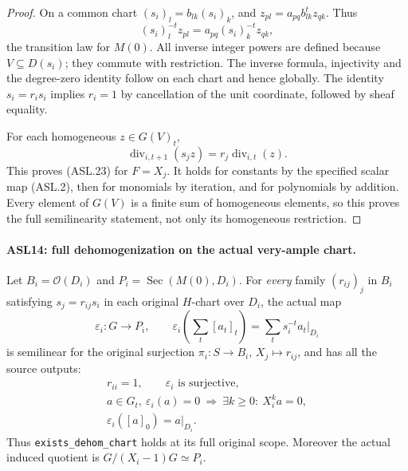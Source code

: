 \documentclass[11pt,a4paper]{article}
\numberwithin{equation}{section}
\theoremstyle{remark}\newtheorem{remark}[theorem]{Remark}
\begin{document}
\begin{proof}
On a common chart $(s_i)_l=b_{lk}(s_i)_k$, and
$z_{pl}=a_{pq}b_{lk}^{t}z_{qk}$.  Thus
\[
 (s_i)_l^{-t}z_{pl}
       =a_{pq}(s_i)_k^{-t}z_{qk},
\]
the transition law for $M(0)$.  All inverse integer powers
are defined because $V\subseteq D(s_i)$; they commute with
restriction.  The inverse formula, injectivity and the
degree-zero identity follow on each chart and hence globally.
The identity $s_i=r_is_i$ implies $r_i=1$ by cancellation
of the unit coordinate, followed by sheaf equality.

For each homogeneous $z\in G(V)_t$,
\[
 \operatorname{div}_{i,t+1}(s_jz)
               =r_j\operatorname{div}_{i,t}(z).
\]
This proves (ASL.23) for $F=X_j$.  It holds for constants by
the specified scalar map (ASL.2), then for monomials by iteration,
and for polynomials by addition.  Every element of $G(V)$ is a
finite sum of homogeneous elements, so this proves the full
semilinearity statement, not only its homogeneous restriction.
\end{proof}

\paragraph{ASL14: full dehomogenization on the actual very-ample chart.}
\label{claim:ASL14}
Let $B_i=\mathcal O(D_i)$ and
$P_i=\operatorname{Sec}(M(0),D_i)$.  For \emph{every} family
$(r_{ij})_j$ in $B_i$ satisfying $s_j=r_{ij}s_i$ in each original
$H$-chart over $D_i$, the actual map
\[
 \varepsilon_i:G\longrightarrow P_i,
 \qquad \varepsilon_i\left(\sum_t[a_t]_t\right)
                     =\sum_t s_i^{-t}a_t|_{D_i}
                                                        \tag{ASL.24}
\]
is semilinear for the original surjection
$\pi_i:S\to B_i$, $X_j\mapsto r_{ij}$, and has all the
source outputs:
\[
 \begin{gathered}
 r_{ii}=1,\qquad \varepsilon_i\text{ is surjective},\\
 a\in G_t,\ \varepsilon_i(a)=0
       \ \Longrightarrow\ \exists k\ge0:\ X_i^ka=0,\\
 \varepsilon_i([a]_0)=a|_{D_i}.
 \end{gathered}                                         \tag{ASL.25}
\]
Thus \texttt{exists\_\allowbreak{}dehom\_\allowbreak{}chart} holds at its full original
scope.  Moreover the actual induced quotient is
$G/(X_i-1)G\simeq P_i$.
\end{document}
